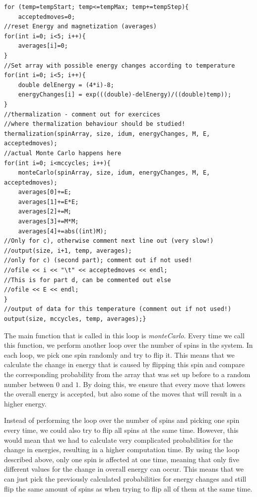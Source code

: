 \documentclass[10pt,a4paper]{article}
\begin{document}
\begin{lstlisting}
for (temp=tempStart; temp<=tempMax; temp+=tempStep){
	acceptedmoves=0;
//reset Energy and magnetization (averages)
for(int i=0; i<5; i++){
	averages[i]=0;
}
//Set array with possible energy changes according to temperature
for(int i=0; i<5; i++){
	double delEnergy = (4*i)-8;
	energyChanges[i] = exp(((double)-delEnergy)/((double)temp));
}
//thermalization - comment out for exercices
//where thermalization behaviour should be studied!
thermalization(spinArray, size, idum, energyChanges, M, E, acceptedmoves);
//actual Monte Carlo happens here
for(int i=0; i<mccycles; i++){
	monteCarlo(spinArray, size, idum, energyChanges, M, E, acceptedmoves);
	averages[0]+=E;
	averages[1]+=E*E;
	averages[2]+=M;
	averages[3]+=M*M;
	averages[4]+=abs((int)M);
//Only for c), otherwise comment next line out (very slow!)
//output(size, i+1, temp, averages);
//only for c) (second part); comment out if not used!
//ofile << i << "\t" << acceptedmoves << endl;
//This is for part d, can be commented out else
//ofile << E << endl;
}
//output of data for this temperature (comment out if not used!)
output(size, mccycles, temp, averages);}
\end{lstlisting}

The main function that is called in this loop is \emph{monteCarlo}. Every time we call this function, we perform another loop over the number of spins in the system. In each loop, we pick one spin randomly and try to flip it. This means that we calculate the change in energy that is caused by flipping this spin and compare the corresponding probability from the array that was set up before to a random number between $0$ and $1$. By doing this, we ensure that every move that lowers the overall energy is accepted, but also some of the moves that will result in a higher energy.

Instead of performing the loop over the number of spins and picking one spin every time, we could also try to flip all spins at the same time. However, this would mean that we had to calculate very complicated probabilities for the change in energies, resulting in a higher computation time. By using the loop described above, only one spin is affected at one time, meaning that only five different values for the change in overall energy can occur. This means that we can just pick the previously calculated probabilities for energy changes and still flip the same amount of spins as when trying to flip all of them at the same time.
\end{document}
